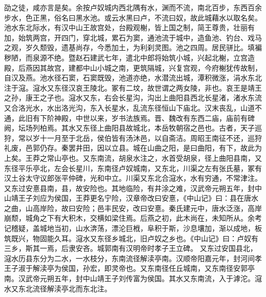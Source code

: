 \documentclass[12pt,UTF8]{ctexbook}
\begin{document}
劭之徒，咸亦言是矣。余按卢奴城内西北隅有水，渊而不流，南北百步，东西百余步水，色正黑，俗名曰黑水池。或云水黑曰卢，不流曰奴，故此城藉水以取名矣。池水东北际水，有汉中山王故宫处，台殿观榭，皆上国之制，简王尊贵，壮丽有加，始筑两宫，开四门，穿北城，累石为窦，通池流于城中，造鱼池、钓台、戏马之观，岁久颓毁，遗基尚存，今悉加土，为利刹灵图。池之四周。居民骈比。填褊秽陋，而泉源不绝。暨赵石建武七年，遣北中郎将始筑小城，兴起北榭，立宫造殿，后燕因其故宫，建都中山小城之南，更筑隔城，兴复宫观，今府榭犹传故制，自汉及燕。池水径石窦，石窦既毁，池道亦绝，水潜流出城，潭积微涨，涓水东北注于滱。滱水又东径汉哀王陵北。冢有二坟，故世谓之两女陵，非也。哀王是靖王之孙，康王之子也。滱水又东，右会长星沟，沟出上曲阳县西北长星渚，渚水东流又合洛光水，水出洛光沟，东入长星水，乱流东径恒山下庙北。汉末丧乱，山道不通，此旧有下阶神殿，中世以来，岁书法族焉。晋、魏改有东西二庙，庙前有碑阙，坛场列柏焉。其水又东径上曲阳县故城北，本岳牧朝宿之邑也。古者，天子巡狩，常以岁十一月至于北岳，侯伯皆有汤沐邑，以自斋洁。周昭王南征不还，巡狩礼废，邑郭仍存。秦罢井田，因以立县。城在山曲之阳，是曰曲阳，有下，故此为上矣。王莽之常山亭也。又东南流，胡泉水注之，水首受胡泉，径上曲阳县南，又东径平乐亭北，左会长星川，东南径卢奴城南，又东北，川渠之左有张氏墓，冢有汉土谷太守议郎张平仲碑，光和中立。川渠又东北合滱水，水有穷通，不常津注。
又东过安憙县南，县，故安险也。其地临险，有井涂之难，汉武帝元朔五年，封中山靖王子刘应为侯国，王莽更名宁险，汉章帝改曰安憙，《中山记》曰：县在唐水之曲，山高岸险，故曰安险；邑丰民安，改曰安憙。秦氏建元中，唐水泛涨，高岸崩颓，城角之下有大积木，交横如梁住焉。后燕之初，此木尚在，未知所从。余考记稽疑，盖城地当初，山水渀荡，漂沦巨栰，阜积于斯，沙息壤加，渐以成地，板筑既兴，物固能久耳。滱水又东径乡城北，旧卢奴之乡也。《中山记》曰：卢奴有三乡，斯其一焉，后隶安吝。城郭南有汉明帝时孝子王立碑。
又东过安国县北，滱水历县东分为二水，一水枝分，东南流径解渎亭南。汉顺帝阳嘉元年，封河间孝王子淑于解渎亭为侯国，孙宏，即灵帝也。又东南径任丘城南，又东南径安郭亭南。汉武帝元朔五年，封中山靖王子刘传富为侯国。其水又东南流，入于滹沱。滱水又东北流径解渎亭北而东北注。
\end{document}
